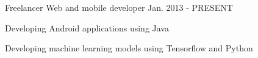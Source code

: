 

\begin{cventries}

  \cventry
      {Freelancer} %
    { Web and mobile developer} %
    {} %
    {Jan. 2013 - PRESENT} %
    {
      \begin{cvitems} %
        \item {Developing Android  applications using Java}
        \item {Developing machine learning models using Tensorflow and Python}
        \end{cvitems}
    }

 

 

 
 

\end{cventries}
